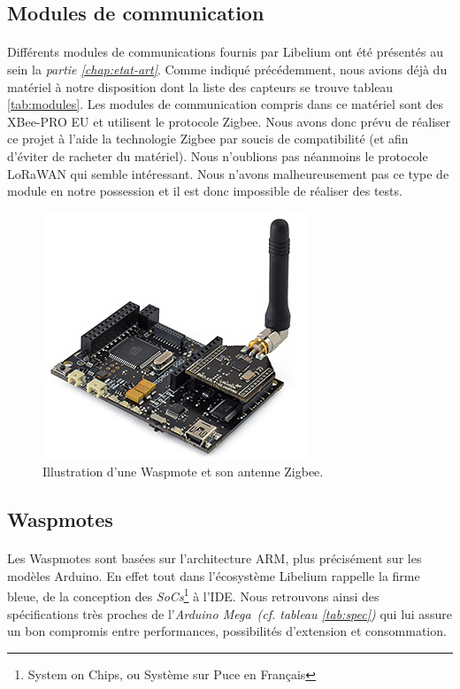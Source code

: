     \subsection{Modules de communication}
        \paragraph{}Différents modules de communications fournis par Libelium ont été présentés au sein la \textit{partie \ref{chap:etat-art}}. Comme indiqué précédemment, nous avions déjà du matériel à notre disposition dont la liste des capteurs se trouve tableau \ref{tab:modules}. Les modules de communication compris dans ce matériel sont des XBee-PRO EU et utilisent le protocole Zigbee. Nous avons donc prévu de réaliser ce projet à l'aide la technologie Zigbee par soucis de compatibilité (et afin d'éviter de racheter du matériel). 
        Nous n'oublions pas néanmoins le protocole LoRaWAN qui semble intéressant. Nous n'avons malheureusement pas ce type de module en notre possession et il est donc impossible de réaliser des tests.
        
    
    \begin{figure}[h]
        \centering
        \includegraphics[scale=0.7]{images/photos/waspmote.png}
        \caption{Illustration d'une Waspmote et son antenne Zigbee.}
        \label{fig:wasp}
    \end{figure}

    
    \subsection{Waspmotes}
        \paragraph{}Les Waspmotes sont basées sur l'architecture ARM, plus précisément sur les modèles Arduino. En effet tout dans l'écosystème Libelium rappelle la firme bleue, de la conception des \emph{SoCs}\footnote{System on Chips, ou Système sur Puce en Français} à l'IDE. Nous retrouvons ainsi des spécifications très proches de l'\emph{Arduino Mega}~\textit{(cf. tableau \ref{tab:spec})} qui lui assure un bon compromis entre performances, possibilités d'extension et consommation.
        
